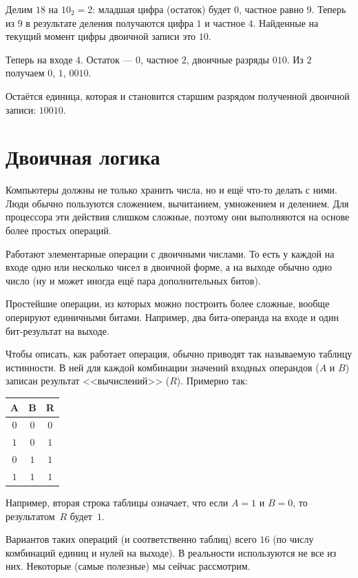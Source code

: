 Делим $18$ на $10_2=2$: младшая цифра (остаток) будет $0$, частное равно $9$.
Теперь из $9$ в результате деления получаются цифра $1$ и частное $4$.
Найденные на текущий момент цифры двоичной записи это $10$.

Теперь на входе $4$. Остаток --- $0$, частное $2$, двоичные разряды $010$.
Из $2$ получаем $0$, $1$, $0010$.

Остаётся единица, которая и становится старшим разрядом полученной двоичной записи: $10010$.

\section{Двоичная логика}

Компьютеры должны не только хранить числа, но и ещё что-то делать с ними.
Люди обычно пользуются сложением, вычитанием, умножением и делением.
Для процессора эти действия слишком сложные, поэтому они выполняются
на основе более простых операций.

Работают элементарные операции с двоичными числами. То есть у каждой на входе
одно или несколько чисел в двоичной форме, а на выходе обычно одно число
(ну и может иногда ещё пара дополнительных битов).

Простейшие операции, из которых можно построить более сложные,
вообще оперируют единичными битами. Например, два бита-операнда
на входе и один бит-результат на выходе.

Чтобы описать, как работает операция, обычно приводят
так называемую таблицу истинности. В ней для каждой комбинации значений входных
операндов ($A$ и $B$) записан результат <<вычислений>> ($R$). Примерно так:

\begin{center}
\begin{tabular}{|c|c|c|}
 \hline
 \textbf{A} & \textbf{B} & \textbf{R} \\ \hline
 $0$ & $0$ & $0$ \\ \hline
 $1$ & $0$ & $1$ \\ \hline
 $0$ & $1$ & $1$ \\ \hline
 $1$ & $1$ & $1$ \\ \hline
\end{tabular}
\end{center}

Например, вторая строка таблицы означает, что если $A=1$ и $B=0$, то результатом~$R$ будет~$1$.

Вариантов таких операций (и соответственно таблиц) всего $16$ (по числу комбинаций единиц и нулей на выходе).
В реальности используются не все из них. Некоторые (самые полезные) мы сейчас рассмотрим.

